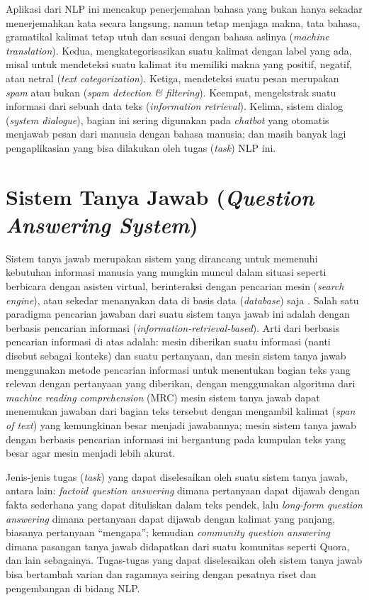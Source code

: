 Aplikasi dari NLP ini mencakup penerjemahan bahasa yang bukan hanya sekadar menerjemahkan kata secara langsung, namun tetap menjaga makna, tata bahasa, gramatikal kalimat tetap utuh dan sesuai dengan bahasa aslinya (\emph{machine translation}). Kedua, mengkategorisasikan suatu kalimat dengan label yang ada, misal untuk mendeteksi suatu kalimat itu memiliki makna yang positif, negatif, atau netral (\emph{text categorization}). Ketiga, mendeteksi suatu pesan merupakan \emph{spam} atau bukan (\emph{spam detection & filtering}). Keempat, mengekstrak suatu informasi dari sebuah data teks (\emph{information retrieval}). Kelima, sistem dialog (\emph{system dialogue}), bagian ini sering digunakan pada \emph{chatbot} yang otomatis menjawab pesan dari manusia dengan bahasa manusia; dan masih banyak lagi pengaplikasian yang bisa dilakukan oleh tugas (\emph{task}) NLP ini.

\section{Sistem Tanya Jawab (\emph{Question Answering System})}
Sistem tanya jawab merupakan sistem yang dirancang untuk memenuhi kebutuhan informasi manusia yang mungkin muncul dalam situasi seperti berbicara dengan asisten virtual, berinteraksi dengan pencarian mesin (\emph{search engine}), atau sekedar menanyakan data di basis data (\emph{database}) saja \citep{daniel2007speech}. Salah satu paradigma pencarian jawaban dari suatu sistem tanya jawab ini adalah dengan berbasis pencarian informasi (\emph{information-retrieval-based}). Arti dari berbasis pencarian informasi di atas adalah: mesin diberikan suatu informasi (nanti disebut sebagai konteks) dan suatu pertanyaan, dan mesin sistem tanya jawab menggunakan metode pencarian informasi untuk menentukan bagian teks yang relevan dengan pertanyaan yang diberikan, dengan menggunakan algoritma dari \emph{machine reading comprehension} (MRC) mesin sistem tanya jawab dapat menemukan jawaban dari bagian teks tersebut dengan mengambil kalimat (\emph{span of text}) yang kemungkinan besar menjadi jawabannya; mesin sistem tanya jawab dengan berbasis pencarian informasi ini bergantung pada kumpulan teks yang besar agar mesin menjadi lebih akurat. 

Jenis-jenis tugas (\emph{task}) yang dapat diselesaikan oleh suatu sistem tanya jawab, antara lain: \emph{factoid question answering} dimana pertanyaan dapat dijawab dengan fakta sederhana yang dapat dituliskan dalam teks pendek, lalu \emph{long-form question answering} dimana pertanyaan dapat dijawab dengan kalimat yang panjang, biasanya pertanyaan “mengapa”; kemudian \emph{community question answering} dimana pasangan tanya jawab didapatkan dari suatu komunitas seperti Quora, dan lain sebagainya. Tugas-tugas yang dapat diselesaikan oleh sistem tanya jawab bisa bertambah varian dan ragamnya seiring dengan pesatnya riset dan pengembangan di bidang NLP.

